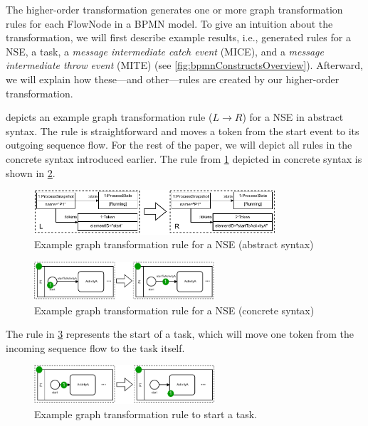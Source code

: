 \documentclass[submission, copyright, creativecommons]{eptcs}
\begin{document}
The higher-order transformation generates one or more graph transformation rules for each \textsf{FlowNode} in a BPMN model.
To give an intuition about the transformation, we will first describe example results, i.e., generated rules for a NSE, a task, a \textit{message intermediate catch event} (MICE), and a \textit{message intermediate throw event} (MITE) (see \cref{fig:bpmnConstructsOverview}).
Afterward, we will explain how these---and other---rules are created by our higher-order transformation.

 depicts an example graph transformation rule ($L \to R$) for a NSE in abstract syntax.
The rule is straightforward and moves a token from the start event to its outgoing sequence flow.
For the rest of the paper, we will depict all rules in the concrete syntax introduced earlier.
The rule from \cref{fig:gtRuleAbstract} depicted in concrete syntax is shown in \cref{fig:gtRuleConcrete}.

\begin{figure}[h]
    \centering
  \includegraphics[width=0.8\textwidth]{images/rule_abstract.pdf}
  \caption{Example graph transformation rule for a NSE (abstract syntax)}  \label{fig:gtRuleAbstract}
\end{figure}

\begin{figure}[h]
    \centering
  \includegraphics[width=0.6\textwidth]{images/rule_concrete.pdf}
  \caption{Example graph transformation rule for a NSE (concrete syntax)}
  \label{fig:gtRuleConcrete}
\end{figure}

The rule in \cref{fig:taskRules} represents the start of a task, which will move one token from the incoming sequence flow to the task itself.

\begin{figure}[h!]
    \centering
    \includegraphics[width=0.6\textwidth]{images/bpmn_semantics-rules.pdf}
    \caption{Example graph transformation rule to start a task.}
    \label{fig:taskRules}
\end{figure}
\end{document}
